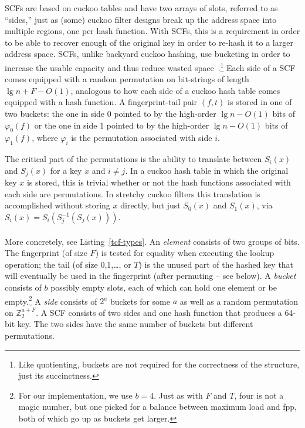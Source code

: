 \documentclass[letterpaper,twocolumn,10pt]{article}
\newcommand{\ints}{\mathbb{Z}}
\newcommand{\taffy}{stretchy}
\newcommand{\Taffy}{Stretchy}
\newcommand{\TCF}{SCF}
\newcommand{\taffy}{taffy}
\newcommand{\Taffy}{Taffy}
\newcommand{\TCF}{TCF}
\begin{document}


\TCF{}s are based on cuckoo tables and have two arrays of slots, referred to as ``sides,'' just as (some) cuckoo filter designs break up the address space into multiple regions, one per hash function.
With \TCF{}s, this is a requirement in order to be able to recover enough of the original key in order to re-hash it to a larger address space.
\TCF{}s, unlike backyard cuckoo hashing, use bucketing in order to increase the usable capacity and thus reduce wasted space~\cite{backyard,buckets}.\footnote{Like quotienting, buckets are not required for the correctness of the structure, just its succinctness.}
Each side of a \TCF{} comes equipped with a random permutation on bit-strings of length $\lg n + F - O(1)$, analogous to how each side of a cuckoo hash table comes equipped with a hash function.
A fingerprint-tail pair $(f, t)$ is stored in one of two buckets: the one in side 0 pointed to by the high-order $\lg n - O(1)$ bits of $\varphi_0(f)$ or the one in side 1 pointed to by the high-order $\lg n - O(1)$ bits of $\varphi_1(f)$, where $\varphi_i$ is the permutation associated with side $i$.

The critical part of the permutations is the ability to translate between $S_i(x)$ and $S_j(x)$ for a key $x$ and $i \ne j$.
In a cuckoo hash table in which the original key $x$ is stored, this is trivial whether or not the hash functions associated with each side are permutations.
In \taffy{} cuckoo filters this translation is accomplished without storing $x$ directly, but just $S_0(x)$ and $S_1(x)$, via $S_i(x) = S_i(S_j^{-1}(S_j(x)))$.


\paragraph{}
More concretely, see Listing~\ref{tcf-types}.
An {\em element} consists of two groups of bits.
The fingerprint (of size $F$) is tested for equality when executing the lookup operation; the tail (of size 0,1,\dots, or $T$) is the unused part of the hashed key that will eventually be used in the fingerprint (after permuting -- see below).
A {\em bucket} consists of $b$ possibly empty slots, each of which can hold one element or be empty.\footnote{
For our implementation, we use $b = 4$.
Just as with $F$ and $T$, four is not a magic number, but one picked for a balance between maximum load and fpp, both of which go up as buckets get larger.
}
A {\em side} consists of $2^a$ buckets for some $a$ as well as a random permutation on $\ints_2^{a+F}$. %
A \TCF{} consists of two sides and one hash function that produces a 64-bit key.
The two sides have the same number of buckets but different permutations.
\end{document}
